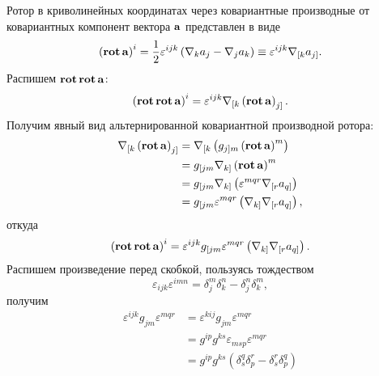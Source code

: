 \documentclass[12pt,a4paper]{article}
\begin{document}
        Ротор в криволинейных координатах через ковариантные производные от ковариантных компонент вектора $\mathbf{a}$ представлен в виде
        \begin{equation}
            \left( \operatorname{\mathbf{rot}}\mathbf{a} \right)^i
                = \frac{1}{2} \varepsilon^{ijk} \left(
                    \nabla_k a_j - \nabla_j a_k
                \right)
                \equiv \varepsilon^{ijk} \nabla_{[k} a_{j]}.
        \end{equation}
        Распишем $\operatorname{\mathbf{rot}}\operatorname{\mathbf{rot}}\mathbf{a}$:
        \begin{equation}
            \left( \operatorname{\mathbf{rot}}\operatorname{\mathbf{rot}}\mathbf{a} \right)^i
                = \varepsilon^{ijk} \nabla_{[k} \left( \operatorname{\mathbf{rot}}\mathbf{a} \right)_{j]}.
        \end{equation}
        Получим явный вид альтернированной ковариантной производной ротора:
        \begin{equation}\begin{aligned}
            \nabla_{[k} \left( \operatorname{\mathbf{rot}}\mathbf{a} \right)_{j]}
                &= \nabla_{[k} \left( g_{j]m} \left( \operatorname{\mathbf{rot}}\mathbf{a} \right)^m \right) \\
                &= g_{[jm} \nabla_{k]} \left( \operatorname{\mathbf{rot}}\mathbf{a} \right)^m \\
                &= g_{[jm} \nabla_{k]} \left(
                       \varepsilon^{mqr} \nabla_{[r} a_{q]}
                \right) \\
                &= g_{[jm} \varepsilon^{mqr} \left(
                   \nabla_{k]} \nabla_{[r} a_{q]}
                \right),
        \end{aligned}\end{equation}
        откуда
        \begin{equation}
            \left( \operatorname{\mathbf{rot}}\operatorname{\mathbf{rot}}\mathbf{a} \right)^i
                = \varepsilon^{ijk} g_{[jm} \varepsilon^{mqr} \left(
                    \nabla_{k]} \nabla_{[r} a_{q]}
                \right).
        \end{equation}
        Распишем произведение перед скобкой, пользуясь тождеством
        \begin{equation}
           \varepsilon_{ijk} \varepsilon^{imn} = \delta_j^m \delta_k^n - \delta_j^n \delta_k^m,
        \end{equation}
        получим
        \begin{equation}\begin{aligned}
           \varepsilon^{ijk} g_{jm} \varepsilon^{mqr}
                &= \varepsilon^{kij} g_{jm} \varepsilon^{mqr} \\
                &= g^{ip} g^{ks} \varepsilon_{msp} \varepsilon^{mqr} \\
                &= g^{ip} g^{ks} \left(
                    \delta_s^q \delta_p^r - \delta_s^r \delta_p^q
                \right)
        \end{aligned}\end{equation}
\end{document}
